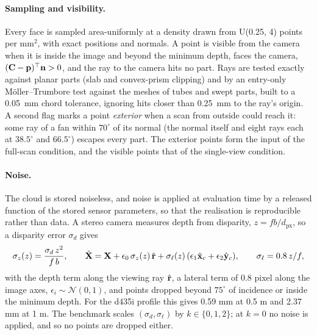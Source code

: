 \paragraph{Sampling and visibility.} Every face is sampled area-uniformly at a density drawn
from U(0.25, 4) points per mm$^2$, with exact positions and normals. A point is visible from
the camera when it is inside the image and beyond the minimum depth, faces the camera,
$(\mathbf{C}-\mathbf{p})^{\top}\mathbf{n}>0$, and the ray to the camera hits no part. Rays are
tested exactly against planar parts (slab and convex-prism clipping) and by an entry-only
Möller--Trumbore test against the meshes of tubes and swept parts, built to a 0.05~mm chord
tolerance, ignoring hits closer than 0.25~mm to the ray's origin. A second
flag marks a point \emph{exterior} when a scan from outside could reach it: some ray of a fan
within $70^\circ$ of its normal (the normal itself and eight rays each at $38.5^\circ$ and
$66.5^\circ$) escapes every part. The exterior points form the input of
the full-scan condition, and the visible points that of the single-view condition.

\paragraph{Noise.} The cloud is stored noiseless, and noise is applied at evaluation time by
a released function of the stored sensor parameters, so that the realisation is reproducible
rather than data. A stereo camera measures
depth from disparity, $z=fb/d_{\mathrm{px}}$, so a disparity error $\sigma_d$ gives
\begin{equation}
\sigma_z(z)=\frac{\sigma_d\,z^{2}}{f\,b},\qquad
\tilde{\mathbf{X}}=\mathbf{X}+\epsilon_0\,\sigma_z(z)\,\hat{\mathbf{r}}+\sigma_\ell(z)\,(\epsilon_1\hat{\mathbf{x}}_c+\epsilon_2\hat{\mathbf{y}}_c),\qquad
\sigma_\ell=0.8\,z/f,
\label{eq:ws_noise}
\end{equation}
with the depth term along the viewing ray $\hat{\mathbf{r}}$, a lateral term of 0.8 pixel along
the image axes, $\epsilon_i\sim\mathcal{N}(0,1)$, and points dropped beyond $75^\circ$ of
incidence or inside the minimum depth. For the d435i profile this gives 0.59 mm at 0.5 m and
2.37 mm at 1 m. The benchmark scales $(\sigma_d,\sigma_\ell)$ by $k\in\{0,1,2\}$; at $k=0$ no noise is applied,
and so no points are dropped either.


